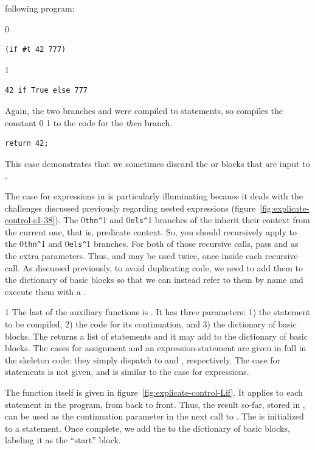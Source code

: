 \documentclass[7x10]{TimesAPriori_MIT}%
\def\racketEd{0}
\def\pythonEd{1}
\def\edition{0}
\newcommand{\racket}[1]{{\if\edition\racketEd{#1}\fi}}
\newcommand{\python}[1]{{\if\edition\pythonEd #1\fi}}
\numberwithin{theorem}{chapter}
\numberwithin{definition}{chapter}
\numberwithin{equation}{chapter}
\begin{document}
following program:
{\if\edition\racketEd
\begin{lstlisting}
(if #t 42 777)
\end{lstlisting}
\fi}
{\if\edition\pythonEd
\begin{lstlisting}
42 if True else 777
\end{lstlisting}
\fi}
%
\noindent Again, the two branches  and  were
compiled to  statements, so 
compiles the constant \racket{} \python{} to the
code for the \emph{then} branch.
\begin{lstlisting}
return 42;
\end{lstlisting}
This case demonstrates that we sometimes discard the  or
 blocks that are input to .

The case for  expressions in  is
particularly illuminating because it deals with the challenges
discussed previously regarding nested  expressions
(figure~\ref{fig:explicate-control-s1-38}).  The
\racket{\lstinline{thn^}}\python{} and
\racket{\lstinline{els^}}\python{} branches of the
 inherit their context from the current one, that is,
predicate context. So, you should recursively apply
 to the
\racket{\lstinline{thn^}}\python{} and
\racket{\lstinline{els^}}\python{} branches. For both of
those recursive calls, pass  and  as the extra
parameters. Thus,  and  may be used twice, once
inside each recursive call. As discussed previously, to avoid
duplicating code, we need to add them to the dictionary of basic
blocks so that we can instead refer to them by name and execute them
with a .

{\if\edition\pythonEd
%
The last of the auxiliary functions is .  It has
three parameters: 1) the statement to be compiled, 2) the code for its
continuation, and 3) the dictionary of basic blocks. The
 returns a list of statements and it may add to
the dictionary of basic blocks. The cases for assignment and an
expression-statement are given in full in the skeleton code: they
simply dispatch to  and
, respectively. The case for 
statements is not given, and is similar to the case for 
expressions.

The  function itself is given in
figure~\ref{fig:explicate-control-Lif}. It applies
 to each statement in the program, from back to
front. Thus, the result so-far, stored in , can be
used as the continuation parameter in the next call to
. The  is initialized to a
 statement. Once complete, we add the  to
the dictionary of basic blocks, labeling it as the ``start'' block.
%
\fi}
\end{document}
